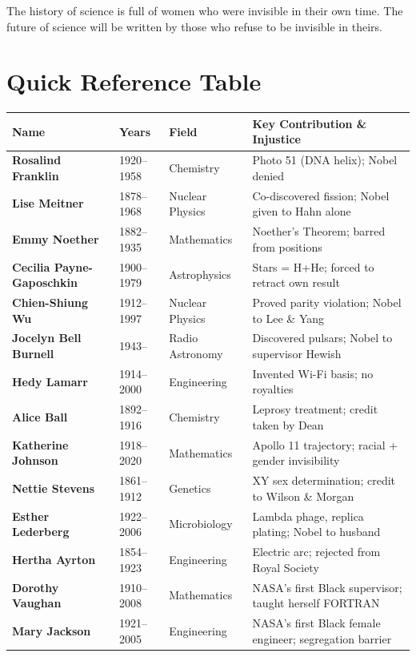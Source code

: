 \documentclass[12pt,a4paper]{article}
\begin{document}
\vspace{12pt}

\begin{tcolorbox}[quotebox]
The history of science is full of women who were invisible in their own time. The future of science will be written by those who refuse to be invisible in theirs.
\end{tcolorbox}

\newpage

\section*{Quick Reference Table}

\renewcommand{\arraystretch}{1.4}
\begin{tabularx}{\textwidth}{@{} >{\bfseries}p{3.2cm} p{1.6cm} p{2.8cm} X @{}}
\toprule
\textbf{Name} & \textbf{Years} & \textbf{Field} & \textbf{Key Contribution \& Injustice}\\
\midrule
\rowcolor{softplum!40}
Rosalind Franklin & 1920--1958 & Chemistry & Photo 51 (DNA helix); Nobel denied\\
Lise Meitner & 1878--1968 & Nuclear Physics & Co-discovered fission; Nobel given to Hahn alone\\
\rowcolor{softplum!40}
Emmy Noether & 1882--1935 & Mathematics & Noether's Theorem; barred from positions\\
Cecilia Payne-Gaposchkin & 1900--1979 & Astrophysics & Stars = H+He; forced to retract own result\\
\rowcolor{softplum!40}
Chien-Shiung Wu & 1912--1997 & Nuclear Physics & Proved parity violation; Nobel to Lee \& Yang\\
Jocelyn Bell Burnell & 1943-- & Radio Astronomy & Discovered pulsars; Nobel to supervisor Hewish\\
\rowcolor{softplum!40}
Hedy Lamarr & 1914--2000 & Engineering & Invented Wi-Fi basis; no royalties\\
Alice Ball & 1892--1916 & Chemistry & Leprosy treatment; credit taken by Dean\\
\rowcolor{softplum!40}
Katherine Johnson & 1918--2020 & Mathematics & Apollo 11 trajectory; racial + gender invisibility\\
Nettie Stevens & 1861--1912 & Genetics & XY sex determination; credit to Wilson \& Morgan\\
\rowcolor{softplum!40}
Esther Lederberg & 1922--2006 & Microbiology & Lambda phage, replica plating; Nobel to husband\\
Hertha Ayrton & 1854--1923 & Engineering & Electric arc; rejected from Royal Society\\
\rowcolor{softplum!40}
Dorothy Vaughan & 1910--2008 & Mathematics & NASA's first Black supervisor; taught herself FORTRAN\\
Mary Jackson & 1921--2005 & Engineering & NASA's first Black female engineer; segregation barrier\\
\bottomrule
\end{tabularx}
\end{document}
